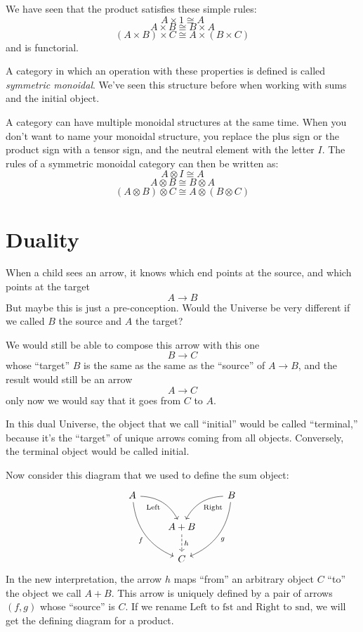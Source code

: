 \documentclass[DaoFP]{subfiles}
\begin{document}
We have seen that the product satisfies these simple rules:
\[A \times 1 \cong A\]
\[A \times B \cong B \times A \]
\[(A \times B) \times C \cong A \times (B \times C) \]
and is functorial. 

A category in which an operation with these properties is defined is called \emph{symmetric monoidal}. We've seen this structure before when working with sums and the initial object. 

A category can have multiple monoidal structures at the same time. When you don't want to name your monoidal structure, you replace the plus sign or the product sign with a tensor sign, and the neutral element with the letter $I$. The rules of a symmetric monoidal category can then be written as:
\[A \otimes I \cong A\]
\[A \otimes B \cong B \otimes A \]
\[(A \otimes B) \otimes C \cong A \otimes (B \otimes C) \]

\section{Duality}

When a child sees an arrow, it knows which end points at the source, and which points at the target
\[A \to B \]
But maybe this is just a pre-conception. Would the Universe be very different if we called $B$ the source and $A$ the target? 

We would still be able to compose this arrow with this one
\[B \to C\]
whose ``target'' $B$ is the same as the same as the ``source'' of $A \to B$, and the result would still be an arrow 
\[A \to C\]
 only now we would say that it goes from $C$ to $A$.

In this dual Universe, the object that we call ``initial'' would be called ``terminal,'' because it's the ``target'' of unique arrows coming from all objects. Conversely, the terminal object would be called initial.

Now consider this diagram that we used to define the sum object:
\[
 \begin{tikzcd}
 A
 \arrow[dr,  bend left, "\text{Left}"']
 \arrow[ddr, bend right, "f"']
 && B
 \arrow[dl, bend right, "\text{Right}"]
 \arrow[ddl, bend left, "g"]
 \\
&A + B
\arrow[d, dashed, "h"]
\\
& C
 \end{tikzcd}
\]
In the new interpretation, the arrow $h$ maps ``from'' an arbitrary object $C$ ``to'' the object we call $A + B$. This arrow is uniquely defined by a pair of arrows $(f, g)$ whose ``source'' is $C$. If we rename $\text{Left}$ to $\text{fst}$ and $\text{Right}$ to $\text{snd}$, we will get  the defining diagram for a product. 
\end{document}
